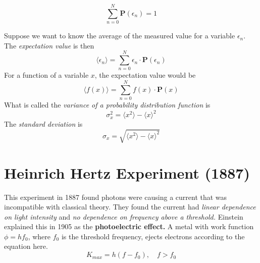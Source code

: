 \begin{equation*}
    \sum_{n=0}^N \mathbf{P}(\epsilon_n) = 1
\end{equation*}

Suppose we want to know the average of the measured value for a variable $\epsilon_n$. The \textit{expectation value} is then
\begin{equation*}
     \langle \epsilon_n \rangle = \sum_{n=0}^N \epsilon_n \cdot \mathbf{P}(\epsilon_n)
\end{equation*}
For a function of a variable $x$, the expectation value would be
\begin{equation*}
     \langle f(x) \rangle = \sum_{n=0}^N f(x) \cdot \mathbf{P}(x)
\end{equation*}
What is called the \textit{variance of a probability distribution function} is
\begin{equation}
    \sigma_x^2 = \langle x^2 \rangle - \langle x \rangle^2
\end{equation}
The \textit{standard deviation} is 
\begin{equation} \label{eq:stddev}
    \sigma_x = \sqrt{\langle x^2 \rangle - \langle x \rangle^2}
\end{equation}





\section{Heinrich Hertz Experiment (1887)}
This experiment in 1887 found photons were causing a current that was incompatible with classical theory. They found the current had \textit{linear dependence on light intensity} and \textit{no dependence on frequency above a threshold.} Einstein explained this in 1905 as the \textbf{photoelectric effect.} A metal with work function $\phi=hf_0$, where $f_0$ is the threshold frequency, ejects electrons according to the equation here.
\begin{equation}\label{eq:photoelectric}
    K_{max} = h(f-f_0), \quad f>f_0
\end{equation}



